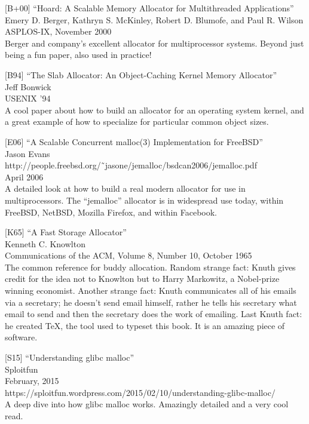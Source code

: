 {[}B+00{]} ``Hoard: A Scalable Memory Allocator for Multithreaded
Applications''\\
Emery D. Berger, Kathryn S. McKinley, Robert D. Blumofe, and Paul R.
Wilson\\
ASPLOS-IX, November 2000\\
Berger and company's excellent allocator for multiprocessor systems.
Beyond just being a fun paper, also used in practice!

{[}B94{]} ``The Slab Allocator: An Object-Caching Kernel Memory
Allocator''\\
Jeff Bonwick\\
USENIX '94\\
A cool paper about how to build an allocator for an operating system
kernel, and a great example of how to specialize for particular common
object sizes.

{[}E06{]} ``A Scalable Concurrent malloc(3) Implementation for
FreeBSD''\\
Jason Evans\\
http://people.freebsd.org/˜jasone/jemalloc/bsdcan2006/jemalloc.pdf\\
April 2006\\
A detailed look at how to build a real modern allocator for use in
multiprocessors. The ``jemalloc'' allocator is in widespread use today,
within FreeBSD, NetBSD, Mozilla Firefox, and within Facebook.

{[}K65{]} ``A Fast Storage Allocator''\\
Kenneth C. Knowlton\\
Communications of the ACM, Volume 8, Number 10, October 1965\\
The common reference for buddy allocation. Random strange fact: Knuth
gives credit for the idea not to Knowlton but to Harry Markowitz, a
Nobel-prize winning economist. Another strange fact: Knuth communicates
all of his emails via a secretary; he doesn't send email himself, rather
he tells his secretary what email to send and then the secretary does
the work of emailing. Last Knuth fact: he created TeX, the tool used to
typeset this book. It is an amazing piece of software.

{[}S15{]} ``Understanding glibc malloc''\\
Sploitfun\\
February, 2015\\
https://sploitfun.wordpress.com/2015/02/10/understanding-glibc-malloc/\\
A deep dive into how glibc malloc works. Amazingly detailed and a very
cool read.

